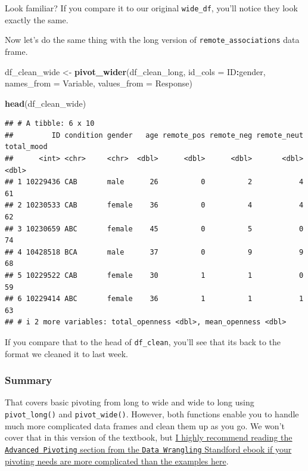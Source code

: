 \documentclass[
]{book}
\newenvironment{Shaded}{\begin{snugshade}}{\end{snugshade}}
\newcommand{\AttributeTok}[1]{\textcolor[rgb]{0.13,0.29,0.53}{#1}}
\newcommand{\FunctionTok}[1]{\textcolor[rgb]{0.13,0.29,0.53}{\textbf{#1}}}
\newcommand{\NormalTok}[1]{#1}
\newcommand{\OtherTok}[1]{\textcolor[rgb]{0.56,0.35,0.01}{#1}}
\newcommand{\SpecialCharTok}[1]{\textcolor[rgb]{0.81,0.36,0.00}{\textbf{#1}}}
\begin{document}
Look familiar? If you compare it to our original \texttt{wide\_df}, you'll notice they look exactly the same.

Now let's do the same thing with the long version of \texttt{remote\_associations} data frame.

\begin{Shaded}
\begin{Highlighting}[]
\NormalTok{df\_clean\_wide }\OtherTok{\textless{}{-}} \FunctionTok{pivot\_wider}\NormalTok{(df\_clean\_long,}
                             \AttributeTok{id\_cols =}\NormalTok{ ID}\SpecialCharTok{:}\NormalTok{gender,}
                             \AttributeTok{names\_from =}\NormalTok{ Variable,}
                             \AttributeTok{values\_from =}\NormalTok{ Response)}

\FunctionTok{head}\NormalTok{(df\_clean\_wide)}
\end{Highlighting}
\end{Shaded}

\begin{verbatim}
## # A tibble: 6 x 10
##         ID condition gender   age remote_pos remote_neg remote_neut total_mood
##      <int> <chr>     <chr>  <dbl>      <dbl>      <dbl>       <dbl>      <dbl>
## 1 10229436 CAB       male      26          0          2           4         61
## 2 10230533 CAB       female    36          0          4           4         62
## 3 10230659 ABC       female    45          0          5           0         74
## 4 10428518 BCA       male      37          0          9           9         68
## 5 10229522 CAB       female    30          1          1           0         59
## 6 10229414 ABC       female    36          1          1           1         63
## # i 2 more variables: total_openness <dbl>, mean_openness <dbl>
\end{verbatim}

If you compare that to the head of \texttt{df\_clean}, you'll see that its back to the format we cleaned it to last week.

\hypertarget{summary-6}{%
\subsubsection{Summary}\label{summary-6}}

That covers basic pivoting from long to wide and wide to long using \texttt{pivot\_long()} and \texttt{pivot\_wide()}. However, both functions enable you to handle much more complicated data frames and clean them up as you go. We won't cover that in this version of the textbook, but \href{https://dcl-wrangle.stanford.edu/pivot-advanced.html}{I highly recommend reading the \texttt{Advanced\ Pivoting} section from the \texttt{Data\ Wrangling} Standford ebook if your pivoting needs are more complicated than the examples here}.
\end{document}

